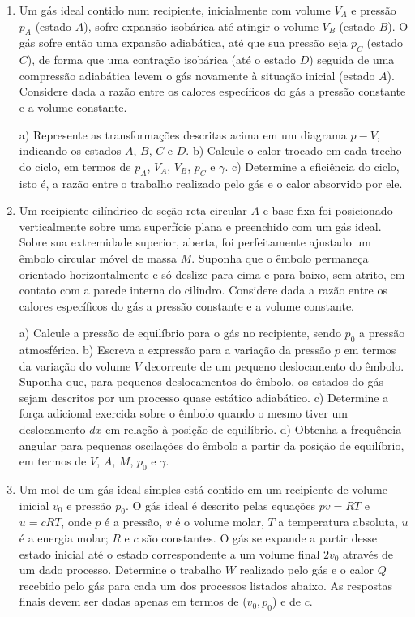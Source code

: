 \begin{enumerate}[start=1,label={\bfseries Q\arabic*.}]
\item Um gás ideal contido num recipiente, inicialmente com volume $V_{A}$ e pressão $p_{A}$ (estado $A$), sofre expansão isobárica até atingir o volume $V_{B}$ (estado $B$). O gás sofre então uma expansão adiabática, até que sua pressão seja $p_{C}$ (estado $C$), de forma que uma contração isobárica (até o estado $D$) seguida de uma compressão adiabática levem o gás novamente à situação inicial (estado $A$). Considere dada a razão entre os calores específicos do gás a pressão constante e a volume constante.


a) Represente as transformações descritas acima em um diagrama $p-V$, indicando os estados $A$, $B$, $C$ e $D$.
b) Calcule o calor trocado em cada trecho do ciclo, em termos de $p_{A}$, $V_{A}$, $V_{B}$, $p_{C}$ e $\gamma$.
c) Determine a eficiência do ciclo, isto é, a razão entre o trabalho realizado pelo gás e o calor absorvido por ele.



\item Um recipiente cilíndrico de seção reta circular $A$ e base fixa foi posicionado verticalmente sobre uma superfície plana e preenchido com um gás ideal. Sobre sua extremidade superior, aberta, foi perfeitamente ajustado um êmbolo circular móvel de massa $M$. Suponha que o êmbolo permaneça orientado horizontalmente e só deslize para cima e para baixo, sem atrito, em contato com a parede interna do cilindro. Considere dada a razão entre os calores específicos do gás a pressão constante e a volume constante.


a) Calcule a pressão de equilíbrio para o gás no recipiente, sendo $p_{0}$ a pressão atmosférica.
b) Escreva a expressão para a variação da pressão $p$ em termos da variação do volume $V$ decorrente de um pequeno deslocamento do êmbolo. Suponha que, para pequenos deslocamentos do êmbolo, os estados do gás sejam descritos por um processo quase estático adiabático.
c) Determine a força adicional exercida sobre o êmbolo quando o mesmo tiver um deslocamento $dx$ em relação à posição de equilíbrio.
d) Obtenha a frequência angular para pequenas oscilações do êmbolo a partir da posição de equilíbrio, em termos de $V$, $A$, $M$, $p_{0}$ e $\gamma$.





\item Um mol de um gás ideal simples está contido em um recipiente de volume inicial $v_{0}$ e pressão $p_{0}$. O gás ideal é descrito pelas equações $pv = RT$ e $u = cRT$, onde $p$ é a pressão, $v$ é o volume molar, $T$ a temperatura absoluta, $u$ é a energia molar; $R$ e $c$ são constantes. O gás se expande a partir desse estado inicial até o estado correspondente a um volume final $2v_{0}$ através de um dado processo. Determine o trabalho $W$ realizado pelo gás e o calor $Q$ recebido pelo gás para cada um dos processos listados abaixo. As respostas finais devem ser dadas apenas em termos de ($v_{0},p_{0}$) e de $c$.



\end{enumerate}
